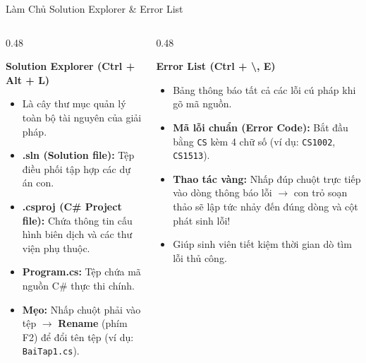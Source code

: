 \documentclass[aspectratio=169, 10pt]{beamer}
\begin{document}
\begin{frame}{Làm Chủ Solution Explorer \& Error List}
  \begin{columns}[T]
    \begin{column}{0.48\textwidth}
      \begin{block}{\textbf{Solution Explorer (Ctrl + Alt + L)}}
        \begin{itemize}
          \item Là cây thư mục quản lý toàn bộ tài nguyên của giải pháp.
          \item \textbf{.sln (Solution file):} Tệp điều phối tập hợp các dự án con.
          \item \textbf{.csproj (C\# Project file):} Chứa thông tin cấu hình biên dịch và các thư viện phụ thuộc.
          \item \textbf{Program.cs:} Tệp chứa mã nguồn C\# thực thi chính.
          \item \textbf{Mẹo:} Nhấp chuột phải vào tệp $\to$ \textbf{Rename} (phím F2) để đổi tên tệp (ví dụ: \texttt{BaiTap1.cs}).
        \end{itemize}
      \end{block}
    \end{column}
    \begin{column}{0.48\textwidth}
      \begin{exampleblock}{\textbf{Error List (Ctrl + \textbackslash, E)}}
        \begin{itemize}
          \item Bảng thông báo tất cả các lỗi cú pháp khi gõ mã nguồn.
          \item \textbf{Mã lỗi chuẩn (Error Code):} Bắt đầu bằng \texttt{CS} kèm 4 chữ số (ví dụ: \texttt{CS1002}, \texttt{CS1513}).
          \item \textbf{Thao tác vàng:} Nhấp đúp chuột trực tiếp vào dòng thông báo lỗi $\to$ con trỏ soạn thảo sẽ lập tức nhảy đến đúng dòng và cột phát sinh lỗi!
          \item Giúp sinh viên tiết kiệm thời gian dò tìm lỗi thủ công.
        \end{itemize}
      \end{exampleblock}
    \end{column}
  \end{columns}
\end{frame}
\end{document}
